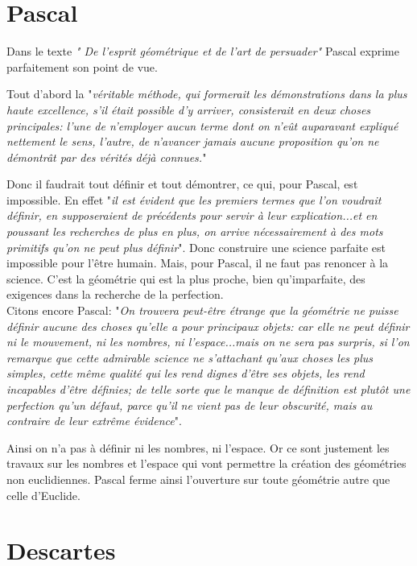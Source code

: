 \documentclass[a4paper, 12pt, twoside]{book}
\begin{document}
  \section{Pascal}
      
    
  Dans le texte \textit{"
  De l'esprit géométrique et de l'art de persuader"} Pascal exprime parfaitement son point de vue.\
  
 Tout d'abord la "\textit{véritable méthode, qui formerait les démonstrations dans la plus haute excellence, s'il était possible d'y arriver, consisterait en deux choses principales: l'une de n'employer aucun terme dont on n'eût auparavant expliqué nettement le sens, l'autre, de n'avancer jamais aucune proposition qu'on ne démontrât par des vérités déjà connues.}"\
 
 Donc il faudrait tout définir et tout démontrer, ce qui, pour Pascal, est impossible. En effet "\textit{il est évident que les premiers termes que l'on voudrait définir, en supposeraient de précédents pour servir à leur explication...et en poussant les recherches de plus en plus, on arrive nécessairement à des mots primitifs qu'on ne peut plus définir}". Donc construire une science parfaite est impossible pour l'être humain. Mais, pour Pascal, il ne faut pas renoncer à la science. C'est la géométrie qui est la plus proche, bien qu'imparfaite, des  exigences dans la recherche de la perfection.\\
 
 Citons encore Pascal: "\textit{On trouvera peut-être étrange que la géométrie ne puisse définir aucune des choses qu'elle a pour principaux objets: car elle ne peut définir ni le mouvement, ni les nombres, ni l'espace...mais on ne sera pas surpris, si l'on remarque que cette admirable science ne s'attachant qu'aux choses les plus simples, cette même qualité qui les rend dignes d'être ses objets, les rend incapables d'être définies; de telle sorte que le manque de définition est plutôt une perfection qu'un défaut, parce qu'il ne vient pas de leur obscurité, mais au contraire de leur extrême évidence}".\
 
 Ainsi on n'a pas à définir ni les nombres, ni l'espace. Or ce sont justement les travaux sur les nombres et l'espace qui vont permettre la création des géométries non euclidiennes. Pascal ferme ainsi l'ouverture sur toute géométrie autre que celle d'Euclide.\\

\section{Descartes}
  
\end{document}
